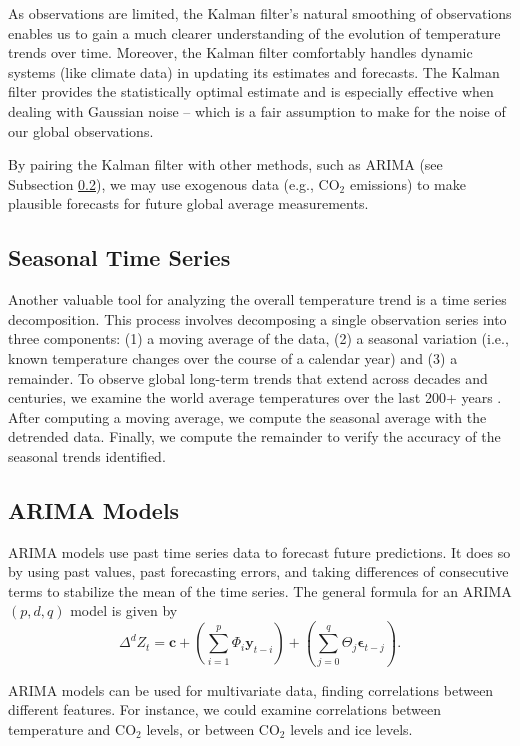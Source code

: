 \documentclass[11pt]{amsart}
\begin{document}
\par As observations are limited, the Kalman filter's natural smoothing of observations enables us to gain a much clearer understanding of the evolution of temperature trends over time.
Moreover, the Kalman filter comfortably handles dynamic systems (like climate data) in updating its estimates and forecasts.
The Kalman filter provides the statistically optimal estimate and is especially effective when dealing with Gaussian noise -- which is a fair assumption to make for the noise of our global observations.

\par By pairing the Kalman filter with other methods, such as ARIMA (see Subsection \ref{met:ARIMA}), we may use exogenous data (e.g., CO$_2$ emissions) to make plausible forecasts for future global average measurements.

\subsection{Seasonal Time Series}
\label{met:seasonal}
Another valuable tool for analyzing the overall temperature trend is a time series decomposition.
This process involves decomposing a single observation series into three components:  (1) a moving average of the data, (2) a seasonal variation (i.e., known temperature changes over the course of a calendar year) and (3) a remainder.
To observe global long-term trends that extend across decades and centuries, we examine the world average temperatures over the last 200+ years \cite{berkeleyearth_temperature}.
After computing a moving average, we compute the seasonal average with the detrended data.
Finally, we compute the remainder to verify the accuracy of the seasonal trends identified.

\subsection{ARIMA Models}
\label{met:ARIMA}
\par ARIMA models use past time series data to forecast future predictions. It does so by using past values, past forecasting errors, and taking differences of consecutive terms to stabilize the mean of the time series. The general formula for an ARIMA$(p, d, q)$ model is given by
\[
\Delta^d Z_t = \mathbf{c} + \left (\sum_{i=1}^p \Phi_i \mathbf{y}_{t- i} \right ) + \left (\sum_{j=0}^q \Theta_j \mathbf{\epsilon}_{t - j} \right ).
\]

\par ARIMA models can be used for multivariate data, finding correlations between different features. For instance, we could examine correlations between temperature and CO$_2$ levels, or between CO$_2$ levels and ice levels.
\end{document}
